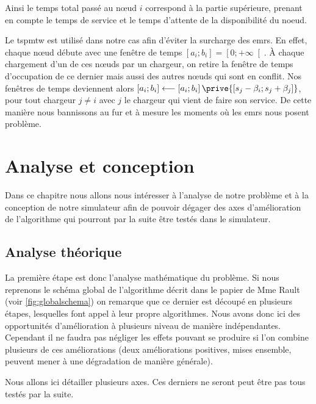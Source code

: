 \documentclass[noposter,final]{polytech/polytech}
\begin{document}
		Ainsi le temps total passé au n\oe ud $i$ correspond à la partie supérieure, prenant en compte le temps de service et le temps d'attente de la disponibilité du noeud.
		
		Le \gls{tspmtw} est utilisé dans notre cas afin d'éviter la surcharge des \glspl{emr}.
		En effet, chaque n\oe ud débute avec une fenêtre de temps $\left[ a_i;b_i\right] = \left[ 0; +\infty\right[$.
		À chaque chargement d'un de ces n\oe uds par un chargeur, on retire la fenêtre de temps d'occupation de ce dernier mais aussi des autres n\oe uds qui sont en conflit.
		Nos fenêtres de temps deviennent alors $\left[ a_i;b_i\right] \longleftarrow \left[ a_i;b_i\right] \prive{\left[ s_j - \beta_i;s_j+\beta_j\right]}$, pour tout chargeur $j\neq i$ avec $j$ le chargeur qui vient de faire son service.
		De cette manière nous bannissons au fur et à mesure les moments où les \glspl{emr} nous posent problème.

\chapter{Analyse et conception}
	Dans ce chapitre nous allons nous intéresser à l'analyse de notre problème et à la conception de notre simulateur afin de pouvoir dégager des axes d'amélioration de l'algorithme qui pourront par la suite être testés dans le simulateur.

	\section{Analyse théorique}
		La première étape est donc l'analyse mathématique du problème.
		Si nous reprenons le schéma global de l'algorithme décrit dans le papier de Mme Rault \cite{Rault:chargers} (voir \autoref{fig:globalschema}) on remarque que ce dernier est découpé en plusieurs étapes, lesquelles font appel à leur propre algorithmes.
		Nous avons donc ici des opportunités d'amélioration à plusieurs niveau de manière indépendantes.
		Cependant il ne faudra pas négliger les effets pouvant se produire si l'on combine plusieurs de ces améliorations (deux améliorations positives, mises ensemble, peuvent mener à une dégradation de manière générale).
		
		Nous allons ici détailler plusieurs axes.
		Ces derniers ne seront peut être pas tous testés par la suite.
		
\end{document}
